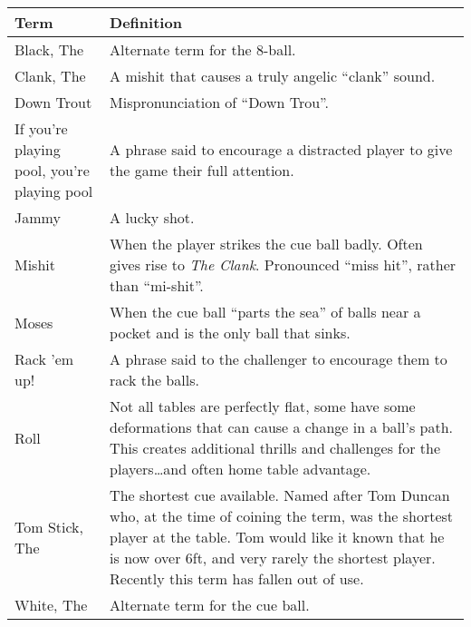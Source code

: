 \small
\begin{center}
    \begin{tabular}{  p{}  p{}  } 
      \hline
      \textbf{Term} & \textbf{Definition} \\ \hline
      Black, The & Alternate term for the 8-ball. \\ \hline
      Clank, The & A mishit that causes a truly angelic “clank” sound. \\ \hline
      Down Trout & Mispronunciation of “Down Trou”. \\ \hline
      If you're playing pool, you're playing pool & A phrase said to encourage a distracted player to give the game their full attention. \\ \hline
      Jammy & A lucky shot. \\ \hline
      Mishit & When the player strikes the cue ball badly. Often gives rise to \emph{The Clank}. Pronounced “miss hit”, rather than “mi-shit”.\\ \hline
      Moses & When the cue ball “parts the sea” of balls near a pocket and is the only ball that sinks. \\ \hline
      Rack 'em up! & A phrase said to the challenger to encourage them to rack the balls. \\ \hline
      Roll & Not all tables are perfectly flat, some have some deformations that can cause a change in a ball's path. This creates additional thrills and challenges for the players\dots\hspace{1mm}and often home table advantage.\\ \hline
      Tom Stick, The & The shortest cue available. Named after Tom Duncan who, at the time of coining the term, was the shortest player at the table. Tom would like it known that he is now over 6ft, and very rarely the shortest player. Recently this term has fallen out of use. \\ \hline
      White, The & Alternate term for the cue ball. \\ \hline
    \end{tabular}
\end{center}
\normalsize

